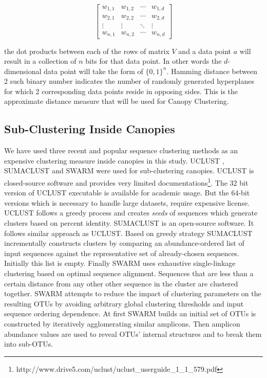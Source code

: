 \documentclass[10pt, conference, compsocconf]{IEEEtran}
\begin{document}
\begin{equation*}
\begin{bmatrix}
w_{1,1} & w_{1,2} & \cdots & w_{1,d} \\
w_{2,1} & w_{2,2} & \cdots & w_{2,d} \\
\vdots  & \vdots  & \ddots & \vdots  \\
w_{n,1} & w_{n,2} & \cdots & w_{n,d} 
\end{bmatrix}
\end{equation*}

the dot products between each of the rows of matrix $V$ and a data point $a$ will result in a collection of $n$ bits for that data point. In other words the $d$-dimensional data point will take the form of $\{0,1\}^n$. Hamming distance between 2 such binary number indicates the number of randomly generated hyperplanes for which 2 corresponding data points reside in opposing sides. This is the approximate distance measure that will be used for Canopy Clustering.  

\subsection{Sub-Clustering Inside Canopies}
We have used three recent and popular sequence clustering methods as an expensive clustering measure inside canopies in this study. UCLUST \cite{MARuclust}, SUMACLUST \cite{MARSumaclust} and SWARM \cite{MARSwarm} were used for sub-clustering canopies. UCLUST is closed-source software and provides very limited documentations\footnote{http://www.drive5.com/uclust/uclust\_userguide\_1\_1\_579.pdf}. The 32 bit version of UCLUST executable is available for academic usage. But the 64-bit versions which is necessary to handle large datasets, require expensive license. UCLUST follows a greedy process and creates \textit{seeds} of sequences which generate clusters based on percent identity.
SUMACLUST is an open-source software. It follows similar approach as UCLUST. Based on greedy strategy SUMACLUST incrementally constructs clusters by comparing an abundance-ordered list of input sequences against the representative set of already-chosen sequences. Initially this list is empty. Finally SWARM uses exhaustive single-linkage clustering based on optimal sequence alignment. Sequences that are less than a certain distance from any other other sequence in the cluster are clustered together. SWARM attempts to reduce the impact of clustering parameters on the resulting OTUs by avoiding arbitrary global clustering thresholds and input sequence ordering dependence. At first SWARM builds an initial set of OTUs is constructed by iteratively agglomerating similar amplicons. Then amplicon abundance values are used to reveal OTUs’ internal structures and to break them into sub-OTUs.
\end{document}

